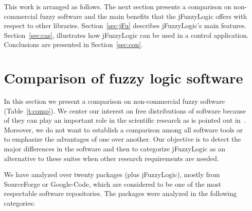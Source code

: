 \documentclass[conference]{IEEEtran}
\begin{document}
This work is arranged as follows.
The next section presents a comparison on non-commercial fuzzy software and the main benefits that the jFuzzyLogic offers with respect to other libraries. 
Section~\ref{sec:jFu} describes jFuzzyLogic's main features. 
Section~\ref{sec:cas}, illustrates how jFuzzyLogic can be used in a control application.
Conclusions are presented in Section~\ref{sec:con}.

\section{Comparison of fuzzy logic software}
\label{sec:stu}

In this section we present a comparison on non-commercial fuzzy software (Table~\ref{t:comp}).
We center our interest on free distributions of software because of they can play an important role in the scientific research as is pointed out in~\cite{Sonnenburg07}.
Moreover, we do not want to establish a comparison among all software tools or to emphasize the advantages of one over another.
Our objective is to detect the major differences in the software and then to categorize jFuzzyLogic as an alternative to these suites when other research requirements are needed.

We have analyzed over twenty packages (plus jFuzzyLogic), mostly from SourceForge or Google-Code, which are considered to be one of the most respectable software repositories.  
The packages were analyzed in the following categories:
\end{document}
